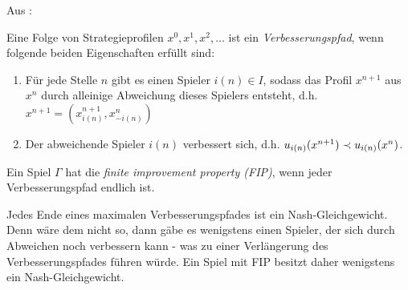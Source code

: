Aus \cite{MonShap}:

\begin{defn}
	Eine Folge von Strategieprofilen $x^0, x^1, x^2, \dots$ ist ein \emph{Verbesserungspfad}, wenn folgende beiden Eigenschaften erfüllt sind:
	\begin{enumerate}
		\item Für jede Stelle $n$ gibt es einen Spieler $i(n) \in I$, sodass das Profil $x^{n+1}$ aus $x^n$ durch alleinige Abweichung dieses Spielers entsteht, d.h. $x^{n+1} = (x^{n+1}_{i(n)}, x^n_{-i(n)})$
		\item Der abweichende Spieler $i(n)$ verbessert sich, d.h. $u_{i(n)}(x^{n+1}) \prec u_{i(n)}(x^n)$.
	\end{enumerate}
\end{defn}

\begin{defn}
	Ein Spiel $\Gamma$ hat die \emph{finite improvement property (FIP)}, wenn jeder Verbesserungspfad endlich ist.
\end{defn}

\begin{beob}
	Jedes Ende eines maximalen Verbesserungspfades ist ein Nash-Gleichgewicht. Denn wäre dem nicht so, dann gäbe es wenigstens einen Spieler, der sich durch Abweichen noch verbessern kann - was zu einer Verlängerung des Verbesserungspfades führen würde. Ein Spiel mit FIP besitzt daher wenigstens ein Nash-Gleichgewicht.
\end{beob}